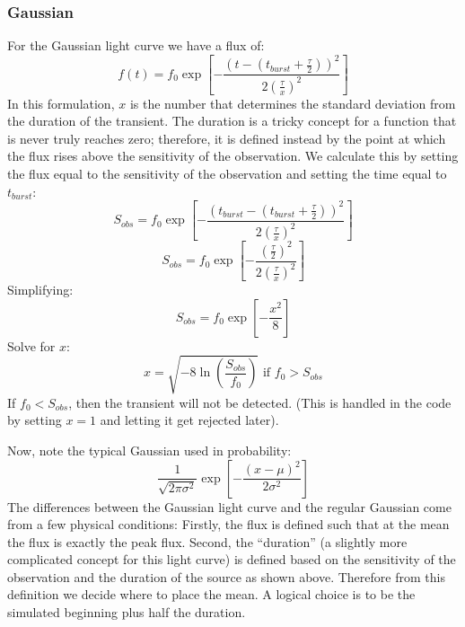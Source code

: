 \documentclass{article}
\begin{document}
\subsubsection{Gaussian}
For the Gaussian light curve we have a flux of:
\[f(t) = f_0  \exp[-\frac{(t-(t_{burst}+\frac{\tau}{2}))^2}{2(\frac{\tau}{x})^2}]\]
In this formulation, $x$ is the number that determines the standard deviation from the duration of the transient. The duration is a tricky concept for a function that is never truly reaches zero; therefore, it is defined instead by the point at which the flux rises above the sensitivity of the observation. We calculate this by setting the flux equal to the sensitivity of the observation and setting the time equal to $t_{burst}$:
\[S_{obs} = f_0 \exp[-\frac{(t_{burst}-(t_{burst}+\frac{\tau}{2}))^2}{2(\frac{\tau}{x})^2}]\]
\[S_{obs} = f_0 \exp[-\frac{(\frac{\tau}{2})^2}{2(\frac{\tau}{x})^2}]\]
Simplifying:
\[S_{obs} = f_0 \exp[-\frac{x^2}{8}]\]
Solve for $x$:
\[x=\sqrt{-8\ln(\frac{S_{obs}}{f_0})}\text{ if }f_0>S_{obs}\]
If $f_0<S_{obs}$, then the transient will not be detected. (This is handled in the code by setting $x=1$ and letting it get rejected later).

Now, note the typical Gaussian used in probability:
\[ \frac{1}{\sqrt{2\pi\sigma^2}}\exp[-\frac{(x-\mu)^2}{2\sigma^2}]\]
The differences between the Gaussian light curve and the regular Gaussian come from a few physical conditions: Firstly, the flux is defined such that at the mean the flux is exactly the peak flux. Second, the ``duration'' (a slightly more complicated concept for this light curve) is defined based on the sensitivity of the observation and the duration of the source as shown above. Therefore from this definition we decide where to place the mean. A logical choice is to be the simulated beginning plus half the duration. 
\end{document}
